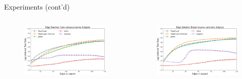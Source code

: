\documentclass{beamer}
\begin{document}
\begin{frame}{Experiments (cont'd)}
  \begin{columns}
    \begin{column}{0.48\textwidth}
      \begin{figure}[ht]
        \centering
        \includegraphics[width=1\textwidth,keepaspectratio]{img/New_Gene_COAD_nsamps_40_repetitions_150_errorbar_1-crop}
      \end{figure}
    \end{column}
    \begin{column}{0.48\textwidth}
      \begin{figure}[ht]
        \centering
        \includegraphics[width=1\textwidth,keepaspectratio]{img/New_Gene_BRCA_nsamps_40_repetitions_150_errorbar_1-crop}
      \end{figure}
    \end{column}
  \end{columns}
  \begin{columns}
    \begin{column}{0.48\textwidth}

\end{column}
\end{columns}
\end{frame}
\end{document}
